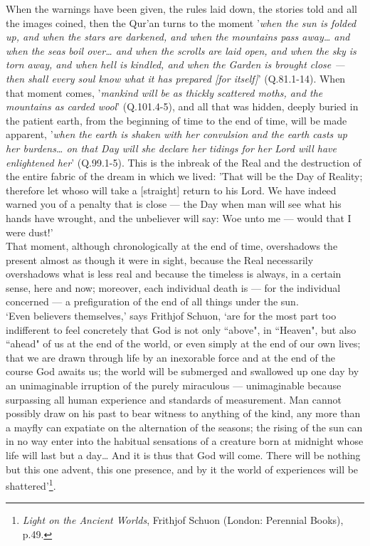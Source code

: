 \documentclass[10pt, twoside,openright]{book}
\begin{document}
When the warnings have been given, the rules laid down, the stories told and all the images coined, 
then the Qur'an turns to the moment '\emph{when the sun is folded up, and when the stars are darkened, and when the mountains pass away\ldots{} and when the seas boil over\ldots{} and when the scrolls are laid open, and when the sky is torn away, and when hell is kindled, and when the Garden is brought close --- then shall every soul know what it has prepared [for itself]}' (Q.81.1-14). When that moment comes, '\emph{mankind will be as thickly scattered moths, and the mountains as carded wool}' (Q.101.4-5), and all that was hidden, deeply buried in the patient earth, from the beginning of time to the end of time, will be made apparent, '\emph{when the earth is shaken with her convulsion and the earth casts up her burdens\ldots{} on that Day will she declare her tidings for her Lord will have enlightened her}' (Q.99.1-5). This is the inbreak of the Real and the destruction of the entire fabric of the dream in which we lived: 'That will be the Day of Reality; therefore let whoso will take a [straight] return to his Lord. We 
have indeed warned you of a penalty that is close --- the Day when man will see what his hands have 
wrought, and the unbeliever will say: Woe unto me --- would that I were dust!' \\

That moment, although chronologically at the end of time, overshadows the present almost as though it 
were in sight, because the Real necessarily overshadows what is less real and because the timeless is 
always, in a certain sense, here and now; moreover, each individual death is --- for the individual 
concerned --- a prefiguration of the end of all things under the sun. \\

`Even believers themselves,' says Frithjof Schuon, `are for the most part too indifferent to feel 
concretely that God is not only ``above", in ``Heaven", but also ``ahead" of us at the end of the world, 
or even simply at the end of our own lives; that we are drawn through life by an inexorable force and 
at the end of the course God awaits us; the world will be submerged and swallowed up one day by an 
unimaginable irruption of the purely miraculous --- unimaginable because surpassing all human 
experience and standards of measurement. Man cannot possibly draw on his past to bear witness to 
anything of the kind, any more than a mayfly can expatiate on the alternation of the seasons; the 
rising of the sun can in no way enter into the habitual sensations of a creature born at midnight 
whose life will last but a day\ldots{} And it is thus that God will come. There will be nothing but this 
one advent, this one presence, and by it the world of experiences will be shattered'\footnote{\emph{Light on the Ancient Worlds}, Frithjof Schuon (London: Perennial Books), p.49.}. \\
\end{document}
